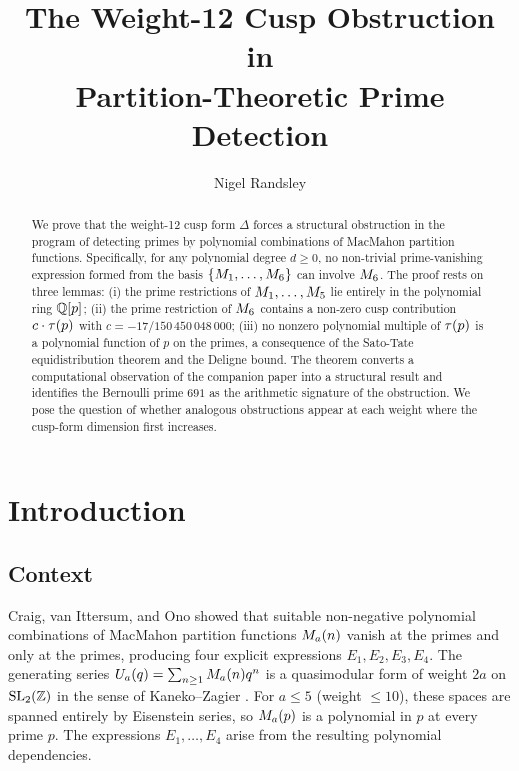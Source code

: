 \documentclass[11pt]{article}
\title{The Weight-12 Cusp Obstruction in\\
       Partition-Theoretic Prime Detection}
\author{Nigel Randsley}
\date{}
\begin{document}
\maketitle

\begin{abstract}
We prove that the weight-12 cusp form $\Delta$ forces a structural obstruction in the
program of detecting primes by polynomial combinations of MacMahon partition functions.
Specifically, for any polynomial degree $d\ge 0$, no non-trivial prime-vanishing expression
formed from the basis $\{M_{1},\dots,M_{6}\}$ can involve $M_{6}$.
The proof rests on three lemmas: (i) the prime restrictions of $M_{1},\dots,M_{5}$ lie
entirely in the polynomial ring $\mathbb{Q}[p]$; (ii) the prime restriction of $M_{6}$ contains a
non-zero cusp contribution $c\cdot\tau(p)$ with $c = -17/150\,450\,048\,000$;
(iii) no nonzero polynomial multiple of $\tau(p)$ is a polynomial function of $p$
on the primes, a consequence of the Sato-Tate equidistribution theorem and the Deligne bound.
The theorem converts a computational observation of the companion paper into a structural
result and identifies the Bernoulli prime $691$ as the arithmetic signature of the
obstruction.
We pose the question of whether analogous obstructions appear at each weight where the
cusp-form dimension first increases.
\end{abstract}

\tableofcontents

\section{Introduction}
\label{sec:intro}

\subsection{Context}

Craig, van Ittersum, and Ono \cite{CIO2024} showed that suitable non-negative polynomial
combinations of MacMahon partition functions $M_{a}(n)$ vanish at the primes and only at
the primes, producing four explicit expressions $E_1,E_2,E_3,E_4$.
The generating series $U_{a}(q)=\sum_{n\ge 1}M_{a}(n)q^n$ is a quasimodular form of
weight $2a$ on $\operatorname{SL}_2(\mathbb{Z})$ in the sense of Kaneko--Zagier \cite{KZ1995}.
For $a\le 5$ (weight $\le 10$), these spaces are spanned entirely by Eisenstein series,
so $M_{a}(p)$ is a polynomial in $p$ at every prime $p$.
The expressions $E_1,\dots,E_4$ arise from the resulting polynomial dependencies.
\end{document}
